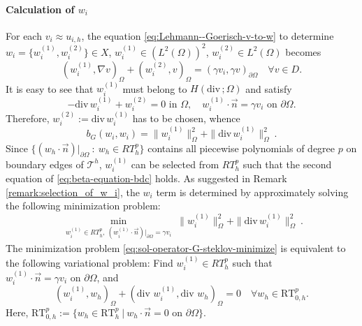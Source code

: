 \documentclass[a4,11pt]{article}
\numberwithin{equation}{section}
\newcommand{\Div}{\mbox{div}\mspace{3mu}}
\begin{document}
\paragraph{Calculation of $w_i$}
%
For each $v_i\approx u_{i,h}$, the equation \cref{eq:Lehmann--Goerisch-v-to-w} to determine ${w}_i=\{w_{i}^{(1)},w_{i}^{(2)}\} \in  X$, $w_i^{(1)} \in (L^2(\Omega))^2$, $w_i^{(2)} \in L^2(\Omega)$ becomes
\begin{equation}\label{sol-operator-G-steklov}
( w_{i}^{(1)}, \nabla v)_{\Omega}
+( w_{i}^{(2)}, v)_{\Omega} = (\gamma v_{i}, \gamma  v)_{\partial\Omega}\quad\forall v \in {D}.
\end{equation}
It is easy to see that $w_{i}^{(1)}$ must belong to $H(\Div ; \Omega)$ and satisfy 
\begin{equation}
\label{eq:beta-equation-bdc}
  - \Div w_{i}^{(1)} + w_{i}^{(2)} =0 \text{ in } \Omega, \quad w_{i}^{(1)}  \cdot \vec{n} = \gamma v_{i} \text{ on } {\partial\Omega}.	
\end{equation}
Therefore, $w_{i}^{(2)}:=\Div w_{i}^{(1)}$ has to be chosen, whence 
$$
b_G(w_i, w_i) =\|w_{i}^{(1)}\|^2_{\Omega} + \|\Div  w_{i}^{(1)}\|^2_{\Omega}~.
$$
Since 
$\{(w_h\cdot \vec{n})|_{\partial\Omega} \::\: w_h\in {RT}^{p}_h\}$ contains all piecewise polynomials of degree $p$ on boundary edges of $\mathcal{T}^h$, 
$w_{i}^{(1)}$ can be selected from ${RT}^{p}_h$ such that the second equation of \cref{eq:beta-equation-bdc} holds.  
As suggested in Remark \ref{remark:selection_of_w_i}, the $w_i$ term is determined by approximately solving the following  minimization problem: 
%
\begin{equation}
\label{eq:sol-operator-G-steklov-minimize}
\min_{\substack{w_{i}^{(1)} \in{RT}^{p}_h,~  (w_{i}^{(1)}\cdot \vec{n})|_{\partial\Omega} = \gamma v_{i}}}
\|w_{i}^{(1)}\|^2_{\Omega} + \|\Div  w_{i}^{(1)}\|^2_{\Omega} ~.
\end{equation}
%
The minimization problem \cref{eq:sol-operator-G-steklov-minimize} is
equivalent to the following variational problem: Find $w_{i}^{(1)} \in{RT}^{p}_h$ such that $w_{i}^{(1)}  \cdot \vec{n} = \gamma v_{i} \text{ on } {\partial\Omega}$, and
\begin{equation}
(w_{i}^{(1)} ,w_h)_{\Omega}+(\Div \,w_{i}^{(1)}, \Div \, w_h)_{\Omega} = 0\quad \forall w_h\in \text{RT}^p_{0,h}.
\end{equation}
Here, $\text{RT}^p_{0,h}:=\{ w_h \in \text{RT}^p_h ~|~  w_h\cdot \vec{n}=0 \text{ on } {\partial \Omega} \}$.

\medskip
\end{document}
